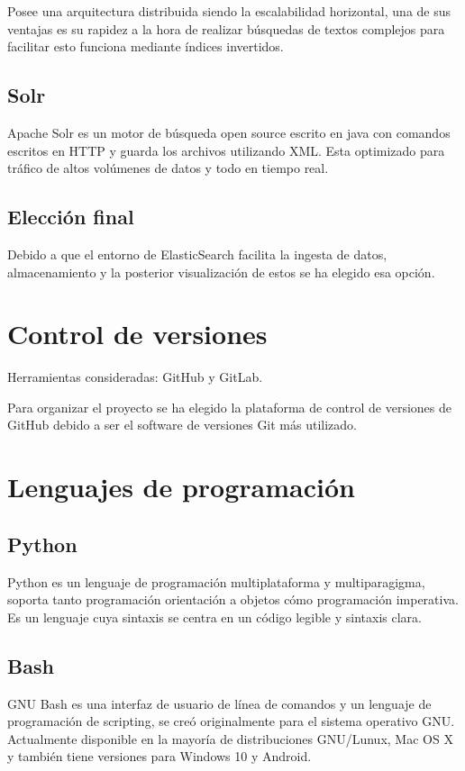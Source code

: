 Posee una arquitectura distribuida siendo la escalabilidad horizontal, una de sus ventajas es su rapidez a la hora de realizar búsquedas de textos complejos para facilitar esto funciona mediante índices invertidos.\cite{pagina:ElasticSearch}  

\subsection{Solr}
Apache Solr es un motor de búsqueda open source escrito en java con comandos escritos en HTTP y guarda los archivos utilizando XML. Esta optimizado para tráfico de altos volúmenes de datos y todo en tiempo real.\cite{pagina:Solr} 

\subsection{Elección final}

Debido a que el entorno de ElasticSearch facilita la ingesta de datos, almacenamiento y la posterior visualización de estos se ha elegido esa opción.

\section{Control de versiones}

Herramientas consideradas: GitHub y GitLab.

Para organizar el proyecto se ha elegido la plataforma de control de versiones de GitHub debido a ser el software de versiones Git más utilizado.

\section{Lenguajes de programación}

\subsection{Python}
Python es un lenguaje de programación multiplataforma y multiparagigma, soporta tanto programación orientación a objetos cómo programación imperativa. Es un lenguaje cuya sintaxis se centra en un código legible y sintaxis clara. \cite{pagina:Python_documentation}

\subsection{Bash}
GNU Bash es una interfaz de usuario de línea de comandos y un lenguaje de programación de scripting, se creó originalmente para el sistema operativo GNU. Actualmente disponible en la mayoría de distribuciones GNU/Lunux, Mac OS X y también tiene versiones para Windows 10 y Android.

